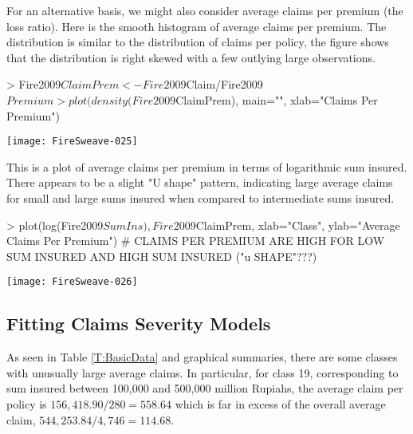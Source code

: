 \documentclass[12pt,letterpaper]{article}
\begin{document}
\newpage

For an alternative basis, we might also consider average claims per premium (the loss ratio). 
Here is the smooth histogram of average claims per premium. The distribution is similar to the distribution
of claims per policy, the
figure shows that the distribution is right skewed
with a few outlying large observations.

\begin{center}
\begin{Schunk}
\begin{Sinput}
> Fire2009$ClaimPrem <- Fire2009$Claim/Fire2009$Premium
> plot(density(Fire2009$ClaimPrem), main="", xlab="Claims Per Premium")
\end{Sinput}
\end{Schunk}
\texttt{[image: FireSweave-025]}
\end{center}

\newpage

This is a plot of average claims per premium in terms of logarithmic sum insured. There appears to be a slight
"U shape" pattern, indicating large average claims for small and large sums insured when compared
to intermediate sums insured.

\begin{center}
\begin{Schunk}
\begin{Sinput}
> plot(log(Fire2009$SumIns),Fire2009$ClaimPrem, xlab="Class", ylab="Average Claims Per Premium")         # CLAIMS PER PREMIUM ARE HIGH FOR LOW SUM INSURED AND HIGH SUM INSURED ("u SHAPE"???)
\end{Sinput}
\end{Schunk}
\texttt{[image: FireSweave-026]}
\end{center}


\newpage

\subsection{Fitting Claims Severity Models}

As seen in Table \ref{T:BasicData} and graphical summaries, there are some classes with unusually large
average claims. In particular, for class 19, corresponding to sum insured between 100,000 and 500,000
million Rupiahs, the average claim per policy is $156,418.90/280 = 558.64$ which is far in excess of the overall
average claim, $544,253.84/4,746 = 114.68$.
\end{document}

